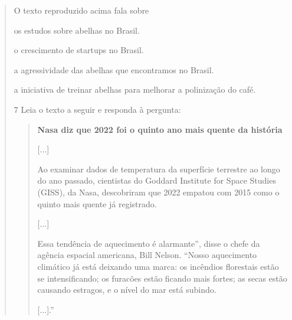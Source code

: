 \begin{quote}
O texto reproduzido acima fala sobre

\begin{escolha}
\item os estudos sobre abelhas no Brasil.

\item o crescimento de startups no Brasil.

\item a agressividade das abelhas que encontramos no Brasil.

\item a iniciativa de treinar abelhas para melhorar a polinização do café.
\end{escolha}


\num{7} Leia o texto a seguir e responda à pergunta:

\begin{quote}
\textbf{Nasa diz que 2022 foi o quinto ano mais quente da história}

{[}...{]}

Ao examinar dados de temperatura da superfície terrestre ao longo do ano
passado, cientistas do Goddard Institute for Space Studies (GISS), da
Nasa, descobriram que 2022 empatou com 2015 como o quinto mais quente já
registrado.

{[}...{]}

Essa tendência de aquecimento é alarmante'', disse o chefe da agência
espacial americana, Bill Nelson. ``Nosso aquecimento climático já está
deixando uma marca: os incêndios florestais estão se intensificando; os
furacões estão ficando mais fortes; as secas estão causando estragos, e
o nível do mar está subindo.

{[}...{]}.''

\end{quote}


\end{quote}
